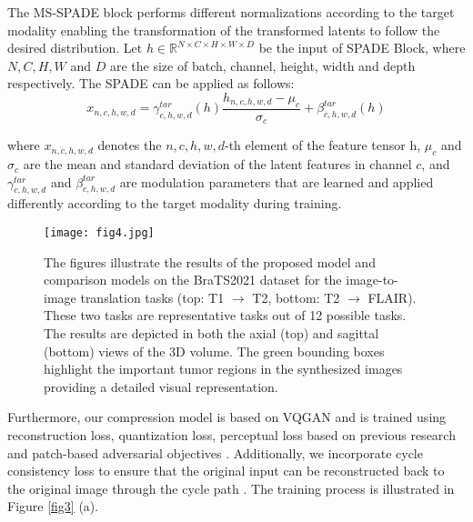 \documentclass[10pt,twocolumn,letterpaper]{article}
\begin{document}
The MS-SPADE block performs different normalizations according to the target modality enabling the transformation of the transformed latents to follow the desired distribution. Let $h \in \mathbb{R}^{N\times C\times H\times W\times D}$ be the input of SPADE Block, where $N, C, H, W$ and $D$ are the size of batch, channel, height, width and depth respectively. The SPADE can be applied as follows:
\begin{equation}  \label{eq:1}
x_{n,c,h,w,d} = \gamma_{c,h,w,d}^{tar}(h)\frac{h_{n,c,h,w,d}-\mu_{c}}{\sigma_{c}} + \beta_{c,h,w,d}^{tar}(h)
\end{equation}

where $x_{n,c,h,w,d}$ denotes the $n,c,h,w,d$-th element of the feature tensor h, $\mu_{c}$ and $\sigma_{c}$ are the mean and standard deviation of the latent features in channel $c$, and $\gamma_{c,h,w,d}^{tar}$ and $\beta_{c,h,w,d}^{tar}$  are modulation parameters that are learned and applied differently according to the target modality during training.

\begin{figure*} [ht]
    \centerline{\texttt{[image: fig4.jpg]}}
    \caption{The figures illustrate the results of the proposed model and comparison models on the BraTS2021 dataset for the image-to-image translation tasks (top: T1 $\rightarrow$ T2, bottom: T2 $\rightarrow$ FLAIR). These two tasks are representative tasks out of 12 possible tasks. The results are depicted in both the axial (top) and sagittal (bottom) views of the 3D volume. The green bounding boxes highlight the important tumor regions in the synthesized images providing a detailed visual representation.}
    \label{fig4}
    \vspace{-8pt}
\end{figure*}

Furthermore, our compression model is based on VQGAN \cite{esser2021taming} and is trained using reconstruction loss, quantization loss, perceptual loss based on previous research and patch-based adversarial objectives \cite{Kingma2014, van2017neural, esser2021taming}. Additionally, we incorporate cycle consistency loss to ensure that the original input can be reconstructed back to the original image through the cycle path \cite{zhu2017unpaired}. The training process is illustrated in Figure \ref{fig3} (a).
\end{document}
